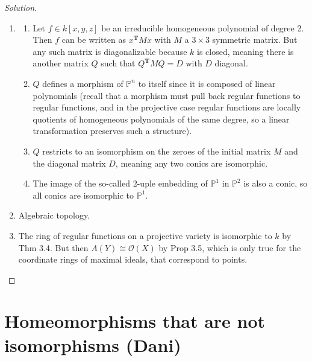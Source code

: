 \begin{manualexercise}{3.1}
\begin{proof}[Solution]
\begin{enumerate}[label=\alph*.]
		\item \leavevmode 

			\begin{enumerate}[label=\textbf{Step \arabic*}]
				\item Let $f \in k[x,y,z]$ be an irreducible homogeneous polynomial of degree 2. Then  $f$ can be written as $x^{\mathbf{T}}Mx$ with $M$ a $3\times 3$ symmetric matrix. But any such matrix is diagonalizable because $k$ is closed, meaning there is another matrix $Q$ such that $Q^{\mathbf{T}}MQ=D$ with $D$ diagonal.

				\item $Q$ defines a morphism of $\mathbb{P}^n$ to itself since it is composed of linear polynomials (recall that a morphism must pull back regular functions to regular functions, and in the projective case regular functions are locally quotients of homogeneous polynomials of the same degree, so a linear transformation preserves such a structure).

				\item $Q$ restricts to an isomorphism on the zeroes of the initial matrix $M$ and the diagonal matrix $D$, meaning any two conics are isomorphic.

				\item The image of the so-called $2$-uple embedding of $\mathbb{P}^1$ in $\mathbb{P}^2$ is also a conic, so all conics are isomorphic to $\mathbb{P}^1$.
			\end{enumerate}

	\item Algebraic topology.

	\item The ring of regular functions on a projective variety is isomorphic to $k$ by Thm 3.4. But then $A(Y)\cong \mathcal{O}(X)$ by Prop 3.5, which is only true for the coordinate rings of maximal ideals, that correspond to points.

	\end{enumerate}
\end{proof}

\end{manualexercise}

\section{Homeomorphisms that are not isomorphisms (Dani)}

